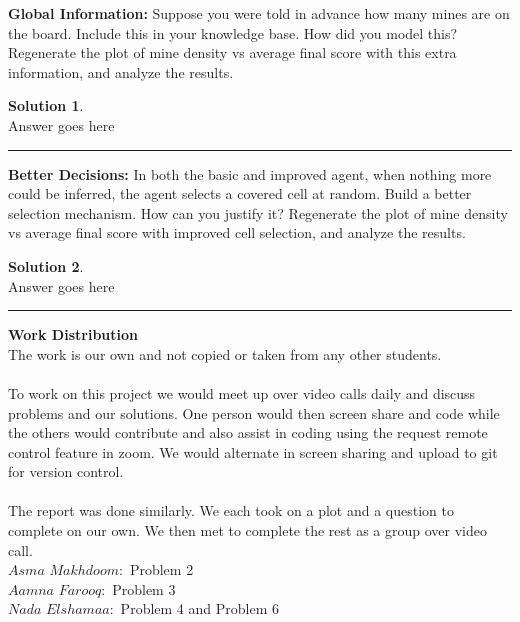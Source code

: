 \documentclass{article}
\theoremstyle{definition}
\def\fline{\rule{0.75\linewidth}{0.5pt}}
\newcommand{\finishline}{\vspace{-15pt}\begin{center}\fline\end{center}}
\newtheorem*{solution*}{Solution}
\newenvironment{solution}{\begin{solution*}}{{\finishline} \end{solution*}}
\begin{document}
\textbf{Global Information: }
	Suppose you were told in advance how many mines are on the board. Include this in your knowledge base. How did you model this? Regenerate the plot of mine density vs average final score with this extra information, and analyze the results.

\smallskip

\begin{solution} \hfill \\
	Answer goes here
\end{solution}

\smallskip

\textbf{Better Decisions: }
	In both the basic and improved agent, when nothing more could be inferred, the agent selects a covered cell at random. Build a better selection mechanism. How can you justify it? Regenerate the plot of mine density vs average final score with improved cell selection, and analyze the results.



\smallskip

\begin{solution} \hfill \\
    Answer goes here
\end{solution}

\textbf{Work Distribution}
\\
The work is our own and not copied or taken from any other students. 
\\\\
To work on this project we would meet up over video calls daily and discuss problems and our solutions. One person would then screen share and code while the others would contribute and also assist in coding using the request remote control feature in zoom. We would alternate in screen sharing and upload to git for version control. 
\\\\
The report was done similarly. We each took on a plot and a question to complete on our own. We then met to complete the rest as a group over video call. 
\\
$Asma$ $Makhdoom:$ Problem 2
\\
$Aamna$ $Farooq:$ Problem 3
\\
$Nada$ $Elshamaa:$ Problem 4 and Problem 6
\\
\smallskip
\end{document}
